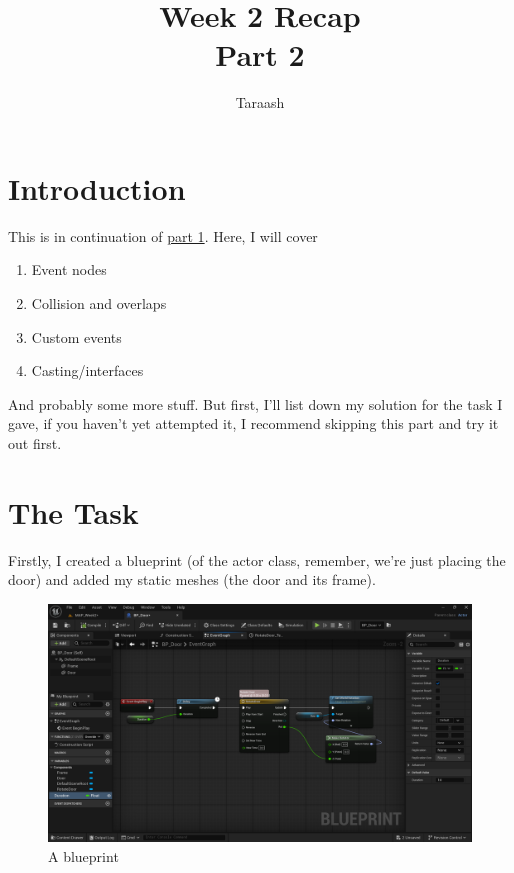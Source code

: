\documentclass[]{article}
\title{Week 2 Recap \\ Part 2}
\author{Taraash}
\date{}
\begin{document}
	\maketitle
	
	\tableofcontents
	
	\newpage
	
	\section{Introduction}
	This is in continuation of \href{https://drive.google.com/file/d/1vT4dVOcDQfwohWIkxxJBOOMfCcRMoxMm/view?usp=sharing}{part 1}. Here, I will cover 
	\begin{enumerate}
		\item Event nodes
		\item Collision and overlaps
		\item Custom events
		\item Casting/interfaces
	\end{enumerate} 
	And probably some more stuff. But first, I'll list down my solution for the task I gave, if you haven't yet attempted it, I recommend skipping this part and try it out first.
	
	\section{The Task}
	Firstly, I created a blueprint (of the actor class, remember, we're just placing the door) and added my static meshes (the door and its frame).
	
	\begin{figure}[h]
		\centering
		\includegraphics[width=1\linewidth]{day4images/screenshot001}
		\caption{A blueprint}
		\label{fig:screenshot001}
	\end{figure}
	
\end{document}
